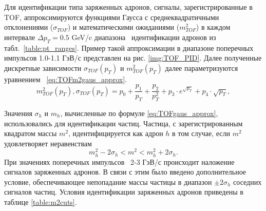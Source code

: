 Для идентификации типа заряженных адронов, сигналы, зарегистрированные в TOF, аппроксимируются функциями Гаусса с среднеквадратичными отклонениями ($\sigma_{TOF}$) и математическими ожиданиями ($m_{TOF}^2$) в каждом интервале $\Delta p_T = 0.5$ GeV/c диапазона \pt \ идентификации адронов из табл.~\ref{table:pt_ranges}.  Пример такой аппроксимации в диапазоне поперечных импульсов 1.0-1.1 ГэВ/с представлен на рис. \ref{img:TOF_PID}. Далее полученные дискретные зависимости $\sigma_{TOF}(p_T)$ и $m_{TOF}^2(p_T)$ далее параметризуются уравнением ~\ref{eq:TOFm2gaus_approx}. 
\begin{equation}
	m_{TOF}^2(p_T),\sigma_{TOF}(p_T) = p_0 +\frac{p_1}{p_T} + \frac{p_2}{p_T^2} + p_3 \cdot e^{\sqrt{p_T}} +p_4 \cdot \sqrt{p_T},
	\label{eq:TOFgaus_approx}
\end{equation}

Значения $\sigma_h$ и $m_h$, вычисленные по формуле \ref{eq:TOFgaus_approx}, использовались для идентификации частиц. Частица, с зарегистрированным квадратом массы $m^2$, идентифицируется как адрон $h$ в том случае, если  $m^2$ удовлетворяет неравенствам $$ m^2_h -2\sigma_h < m^2 < m^2_h +2\sigma_h. $$
При значениях поперечных импульсов \pt~2-3 ГэВ/с происходит наложение сигналов заряженных адронов. В связи с этим было введено дополнительное условие, обеспечивающее непопадание массы частицы в диапазон $\pm 2\sigma_h$ соседних сигналов частиц.
Условия идентификации заряженных адронов приведены в таблице \ref{table:m2cuts}.


\begin{comment}
Диапазон поперечных импульсов разбивается на промежутки шириной 0.1 ГэВ/с, на каждом из которых сигналы заряженных адронов аппроксимируются функцией Гаусса. Пример такой аппроксимации в диапазоне поперечных импульсов 1.0-1.1 ГэВ/с представлен на рис. \ref{img:TOF_PID}. 
Далее зависимости от поперечного импульса полученных среднеквадратичных отклонений ($\Tilde{\sigma}_h$) и математических ожиданий ($\Tilde{m}^2_h$) функций Гаусса для адронов h (h=\pipm,\Kpm,\prot, \aprot ) аппроксимировались функцией  \ref{eq:TOFgaus_approx}.

\begin{equation}
	\label{eq:TOFgaus_approx}
	f(p_T) = P_0 +P_1/p_T + P_2/p_T^2 + P_3 \cdot exp(\sqrt{p_T}) +P_4 \cdot \sqrt{p_T} 
\end{equation}
где $P_i, i \in [1,4]$ - параметры аппроксимации.

Значения $\sigma_h$ и $m_h$, вычисленные по формуле \ref{eq:TOFgaus_approx}, использовались для идентификации частиц. Частица, с зарегистрированным квадратом массы $m^2$, идентифицируется как адрон h в том случае, если  $m^2$ удовлетворяет неравенствам $$ m^2_h -2\sigma_h < m^2 < m^2_h +2\sigma_h. $$
При значениях поперечных импульсов \pt~2-3 ГэВ/с происходит наложение сигналов заряженных адронов. В связи с этим было введено дополнительное условие, обеспечивающее непопадание массы частицы в диапазон $\pm 2\sigma_h$ соседних сигналов частиц.
Условия идентификации заряженных адронов приведены в таблице \ref{table:m2cuts}.
\end{comment}

